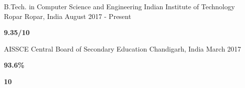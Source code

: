 

\begin{cventries}

  \cventry
    {B.Tech. in Computer Science and Engineering} %
    {Indian Institute of Technology Ropar} %
    {Ropar, India} %
    {August 2017 - Present} %
    {
      \setlength\multicolsep{-12pt}
      \begin{multicols}{2}
      \begin{cvschool} %
        \item[] \textbf{9.35/10}
      \end{cvschool}
      \end{multicols}
    }


\cvedu
    {AISSCE} %
    {Central Board of Secondary Education} %
    {Chandigarh, India} %
    {March 2017} %
    {
      \setlength\multicolsep{-10pt}
      \begin{multicols}{2}
      \begin{cvschool} %
        \item[] \textbf{93.6\%}
        \item[]  \textbf{10}
      \end{cvschool}
      \end{multicols}
    }


\end{cventries}

